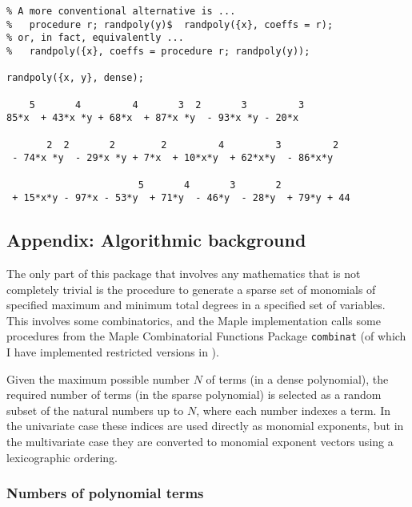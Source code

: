 \begin{verbatim}
% A more conventional alternative is ...
%   procedure r; randpoly(y)$  randpoly({x}, coeffs = r);
% or, in fact, equivalently ...
%   randpoly({x}, coeffs = procedure r; randpoly(y));

randpoly({x, y}, dense);

    5       4         4       3  2       3         3
85*x  + 43*x *y + 68*x  + 87*x *y  - 93*x *y - 20*x

       2  2       2        2         4         3         2
 - 74*x *y  - 29*x *y + 7*x  + 10*x*y  + 62*x*y  - 86*x*y

                       5       4       3       2
 + 15*x*y - 97*x - 53*y  + 71*y  - 46*y  - 28*y  + 79*y + 44
\end{verbatim}




\newtheorem{prop}{Proposition}

\newenvironment{randpproof}%
   {\par\addvspace\baselineskip\noindent\textbf{Proof~}}%
   {\hspace*{\fill}$\Box$\par\addvspace\baselineskip}

\subsection{Appendix: Algorithmic background}

The only part of this package that involves any mathematics that is
not completely trivial is the procedure to generate a sparse set of
monomials of specified maximum and minimum total degrees in a
specified set of variables.  This involves some combinatorics, and the
Maple implementation calls some procedures from the Maple
Combinatorial Functions Package \texttt{combinat} (of which I have
implemented restricted versions in \REDUCE).

Given the maximum possible number $N$ of terms (in a dense
polynomial), the required number of terms (in the sparse polynomial)
is selected as a random subset of the natural numbers up to $N$, where
each number indexes a term.  In the univariate case these indices are
used directly as monomial exponents, but in the multivariate case they
are converted to monomial exponent vectors using a lexicographic
ordering.


\subsubsection{Numbers of polynomial terms}

